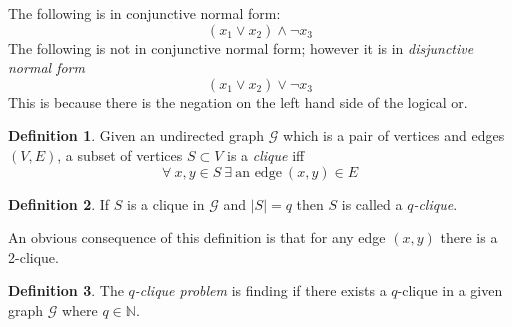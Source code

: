 \documentclass{article}
\theoremstyle{definition}
\newtheorem{definition}{Definition}[section]
\begin{document}
The following is in conjunctive normal form:
$$(x_1 \lor x_2) \land \neg x_3$$
The following is not in conjunctive normal form;
however it is in \textit{disjunctive normal form}
$$(x_1 \lor x_2) \lor \neg x_3$$
This is because there is the negation on the left hand side of the logical or.

\begin{definition}
	Given an undirected graph $\mathcal{G}$ which is a pair of vertices and edges $(V,E)$,
	a subset of vertices $S \subset V$ is a \textit{clique} iff
	$$\forall\ x, y \in S\ \exists\ \textrm{an edge}\ (x,y) \in E$$
\end{definition}

\begin{definition}
	If $S$ is a clique in $\mathcal{G}$ and $|S| = q$ then $S$ is called a \textit{$q$-clique}.
\end{definition}

An obvious consequence of this definition is that for any edge $(x,y)$ there is a 2-clique.

\begin{definition}
	The \textit{$q$-clique problem} is finding if there exists a $q$-clique in a given graph
	$\mathcal{G}$ where $q \in \mathbb{N}$.
\end{definition}
\end{document}
